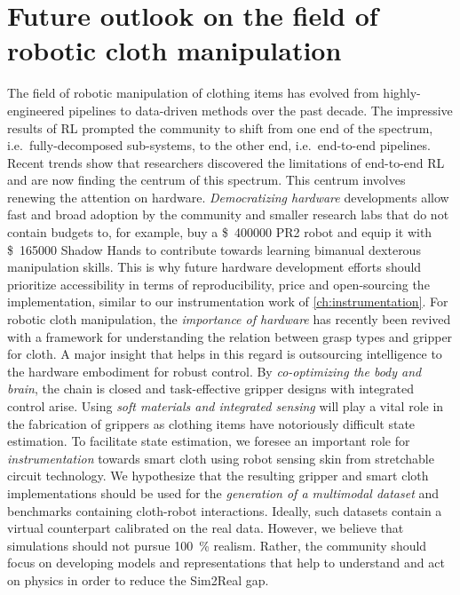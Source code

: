 \documentclass[\home/main.tex]{subfiles}
\begin{document}
\section{Future outlook on the field of robotic cloth manipulation}

The field of robotic manipulation of clothing items has evolved from highly-engineered pipelines to data-driven methods over the past decade. The impressive results of \gls{RL} prompted the community to shift from one end of the spectrum, i.e.\ fully-decomposed sub-systems, to the other end, i.e.\ end-to-end pipelines. Recent trends show that researchers discovered the limitations of end-to-end \gls{RL} and are now finding the centrum of this spectrum.
This centrum involves renewing the attention on hardware.
\emph{Democratizing hardware} developments allow fast and broad adoption by the community and smaller research labs that do not contain budgets to, for example, buy a \SI{400000}[\$]{} PR2 robot and equip it with \SI{165000}[\$]{} Shadow Hands to contribute towards learning bimanual dexterous manipulation skills.
This is why future hardware development efforts should prioritize accessibility in terms of reproducibility, price and open-sourcing the implementation, similar to our instrumentation work of \cref{ch:instrumentation}.
For robotic cloth manipulation, the \emph{importance of hardware} has recently been revived with a framework for understanding the relation between grasp types and gripper for cloth.
A major insight that helps in this regard is outsourcing intelligence to the hardware embodiment for robust control. By \emph{co-optimizing the body and brain}, the chain is closed and task-effective gripper designs with integrated control arise.
Using \emph{soft materials and integrated sensing} will play a vital role in the fabrication of grippers as clothing items have notoriously difficult state estimation.
To facilitate state estimation, we foresee an important role for \emph{instrumentation} towards smart cloth using robot sensing skin from stretchable circuit technology.
We hypothesize that the resulting gripper and smart cloth implementations should be used for the \emph{generation of a multimodal dataset} and benchmarks containing cloth-robot interactions. Ideally, such datasets contain a virtual counterpart calibrated on the real data. However, we believe that simulations should not pursue \qty{100}{\percent} realism. Rather, the community should focus on developing models and representations that help to understand and act on physics in order to reduce the Sim2Real gap.
\end{document}
